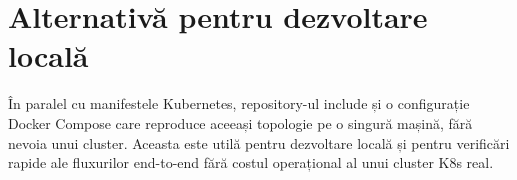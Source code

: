

\section*{Alternativă pentru dezvoltare locală}

În paralel cu manifestele Kubernetes, repository-ul include și o configurație
Docker Compose care reproduce aceeași topologie pe o singură mașină, fără
nevoia unui cluster. Aceasta este utilă pentru dezvoltare locală și pentru
verificări rapide ale fluxurilor end-to-end fără costul operațional al unui
cluster K8s real.


